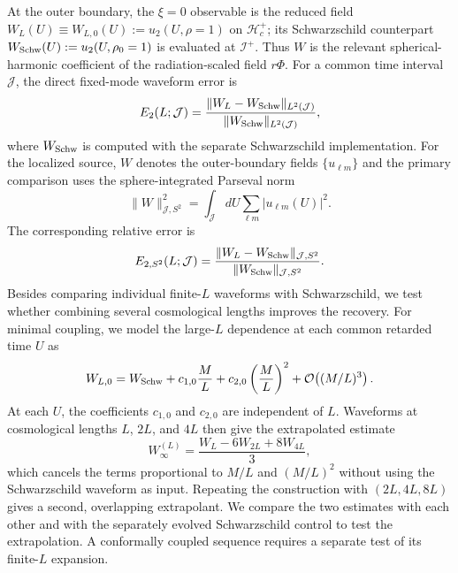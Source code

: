 \documentclass[
 aps,
 prd,
 reprint,
 superscriptaddress,
 nofootinbib,
 longbibliography
]{revtex4-2}
\newcommand{\scri}{\mathscr{I}}
\newcommand{\hc}{\mathcal{H}_{c}^{+}}
\begin{document}
At the outer boundary, the $\xi=0$ observable is the
reduced field $W_L(U)\equiv W_{L,0}(U):=u_2(U,\rho=1)$ on $\hc$; its
Schwarzschild counterpart $W_{\rm Schw}(U):=u_2(U,\rho_0=1)$ is evaluated at
$\scri^+$.  Thus $W$ is the
relevant spherical-harmonic coefficient of the radiation-scaled field
$r\Phi$.  For a common time interval
$\mathcal J$, the direct fixed-mode waveform error is
\begin{equation}
 E_2(L;\mathcal J)=
 \frac{\|W_L-W_{\rm Schw}\|_{L^2(\mathcal J)}}
      {\|W_{\rm Schw}\|_{L^2(\mathcal J)}},
 \label{eq:regulator_E2}
\end{equation}
where $W_{\rm Schw}$ is computed with the separate Schwarzschild implementation.  For the localized source, $W$ denotes the
outer-boundary fields $\{u_{\ell m}\}$ and the primary comparison uses the
sphere-integrated Parseval norm
\begin{equation}
 \|W\|_{\mathcal J,S^2}^2=
 \int_{\mathcal J}dU\sum_{\ell m}|u_{\ell m}(U)|^2.
 \label{eq:parseval_norm}
\end{equation}
The corresponding relative error is
\begin{equation}
 E_{2,S^2}(L;\mathcal J)=
 \frac{\|W_L-W_{\rm Schw}\|_{\mathcal J,S^2}}
      {\|W_{\rm Schw}\|_{\mathcal J,S^2}}.
 \label{eq:localized_regulator_E2}
\end{equation}
Besides comparing individual finite-$L$ waveforms with Schwarzschild, we
test whether combining several cosmological lengths improves the recovery.
For minimal coupling, we model the large-$L$ dependence at each common
retarded time $U$ as
\begin{equation}
 W_{L,0}=W_{\rm Schw}+c_{1,0}\frac{M}{L}
 +c_{2,0}\left(\frac{M}{L}\right)^2
 +\mathcal O\!\left((M/L)^3\right).
 \label{eq:regulator_expansion}
\end{equation}
At each $U$, the coefficients $c_{1,0}$ and $c_{2,0}$ are independent of $L$. Waveforms at cosmological lengths $L$, $2L$, and $4L$ then give the
extrapolated estimate
\begin{equation}
 W_\infty^{(L)}=
 \frac{W_L-6W_{2L}+8W_{4L}}{3},
 \label{eq:nested_extrapolant}
\end{equation}
which cancels the terms proportional to $M/L$ and $(M/L)^2$ without using
the Schwarzschild waveform as input.  Repeating the construction with
$(2L,4L,8L)$ gives a second, overlapping extrapolant.  We compare the two
estimates with each other and with the separately evolved Schwarzschild
control to test the extrapolation. A conformally coupled sequence
requires a separate test of its finite-$L$ expansion.
\end{document}
